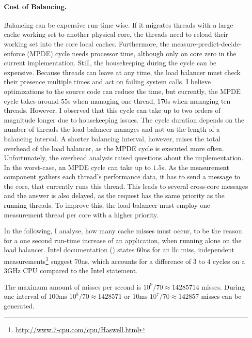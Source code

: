 \paragraph{Cost of Balancing.}
Balancing can be expensive run-time wise.
If it migrates threads with a large cache working set to another physical core,
the threads need to reload their working set into the core local caches.
Furthermore, the measure-predict-decide-enforce (MPDE) cycle needs processor time,
although only on core zero in the current implementation.
Still, the housekeeping during the cycle can be expensive.
Because threads can leave at any time, the load balancer must check their
presence multiple times and act on failing system calls.
I believe optimizations to the source code can reduce the time, but currently,
the MPDE cycle takes around $55$\textmu{}s when managing one thread,
$170$\textmu{}s when managing ten threads.
However, I observed that this cycle can take up to two orders of magnitude
longer due to housekeeping issues.
The cycle duration depends on the number of threads the load
balancer manages and not on the length of a balancing interval.
A shorter balancing interval, however, raises the total overhead of the load
balancer, as the MPDE cycle is executed more often.
Unfortunately, the overhead analysis raised questions about the implementation.
In the worst-case, an MPDE cycle can take up to $1.5$s.
As the measurement component gathers each thread's performance data, it has to
send a message to the core, that currently runs this thread.
This leads to several cross-core messages and the answer is also delayed, as
the request has the same priority as the running threads.
To improve this, the load balancer must employ one measurement thread per core
with a higher priority.

In the following, I analyse, how many cache misses must occur, to be the reason
for a one second run-time increase of an application, when running alone on the load
balancer.
Intel documentation (\cite{intel_perf_analysis_2009}) states $60$ns for an
\gls{llc} miss, independent
measurements\footnote{\url{http://www.7-cpu.com/cpu/Haswell.html}}
suggest $70$ns, which accounts for a difference of $3$ to $4$ cycles on a $3$GHz CPU
compared to the Intel statement.

The maximum amount of misses per second is $10^9/70 \approx 14285714$ misses.
During one interval of $100$ms $10^8/70 \approx 1428571$ or $10$ms $10^7/70 \approx
142857$ misses can be generated.

